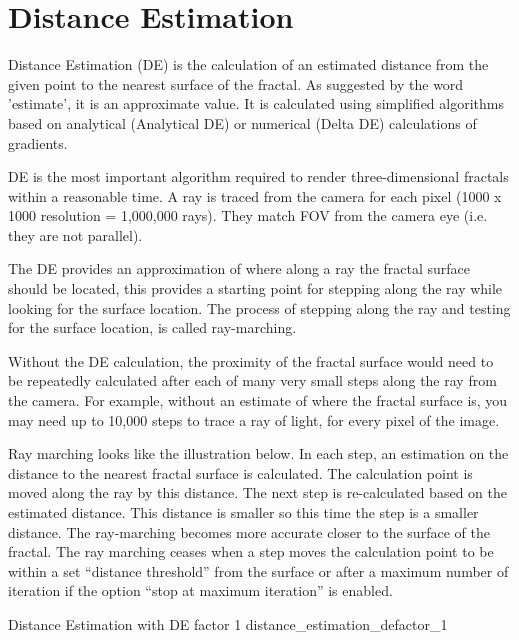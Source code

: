 \section{Distance Estimation}\label{distance-estimation}

Distance Estimation (DE) is the calculation of an estimated distance from the
given point to the nearest surface of the fractal. As suggested by the word
'estimate', it is an approximate value. It is calculated using simplified
algorithms based on analytical (Analytical DE) or numerical (Delta DE)
calculations of gradients.

DE is the most important algorithm required to render three-dimensional fractals
within a reasonable time.  A ray is traced from the camera for each pixel (1000 x 1000 resolution = 1,000,000 rays). They match FOV from the camera eye (i.e. they are not
parallel).

The DE provides an approximation of where along a ray the fractal surface should be located, this provides a starting point for stepping along the ray while looking for the surface location.
The process of stepping along the ray and testing for the surface location, is called ray-marching.

Without the DE calculation, the proximity of the fractal surface would need to be repeatedly calculated after each of many very small steps along the ray from the camera. For example, without an estimate of where the fractal surface is, you may need up to 10,000 steps to trace a ray of light, for every pixel of the image.



Ray marching looks like the illustration below. In each step, an estimation on
the distance to the nearest fractal surface is calculated. The calculation point is moved
along the ray by this distance. The next step is re-calculated based on the
estimated distance. This distance is smaller so this time the step is a
smaller distance. The ray-marching becomes more accurate closer to the surface
of the fractal. The ray marching ceases when a step moves the calculation point to be within a set
``distance threshold'' from the surface or after a maximum number of iteration
if the option ``stop at maximum iteration'' is enabled.

{Distance Estimation with DE factor 1}
{distance_estimation_defactor_1}

